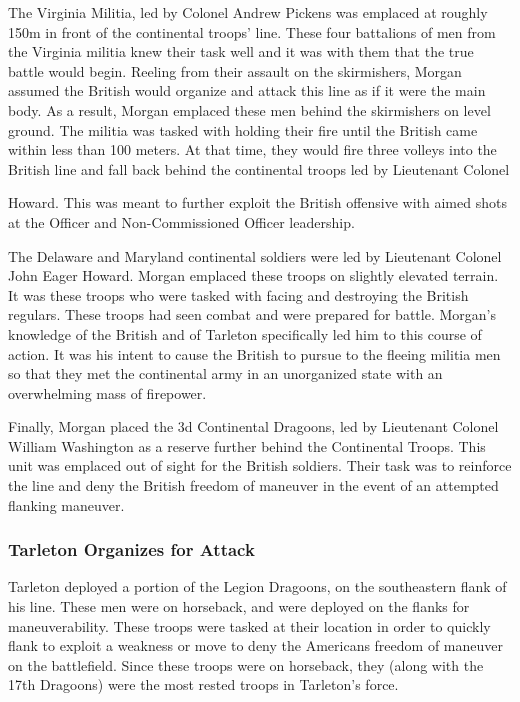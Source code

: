 The Virginia Militia, led by Colonel Andrew Pickens was emplaced at roughly
150m in front of the continental troops' line. These four battalions of men
from the Virginia militia knew their task well and it was with them that the
true battle would begin. Reeling from their assault on the skirmishers, Morgan
assumed the British would organize and attack this line as if it were the main
body. As a result, Morgan emplaced these men behind the skirmishers on level
ground. The militia was tasked with holding their fire until the British came
within less than 100 meters. At that time, they would fire three volleys into
the British line and fall back behind the continental troops led by Lieutenant
Colonel

Howard. This was meant to further exploit the British offensive with aimed
shots at the Officer and Non-Commissioned Officer leadership.

The Delaware and Maryland continental soldiers were led by Lieutenant Colonel
John Eager Howard. Morgan emplaced these troops on slightly elevated terrain.
It was these troops who were tasked with facing and destroying the British
regulars. These troops had seen combat and were prepared for battle. Morgan's
knowledge of the British and of Tarleton specifically led him to this course of
action. It was his intent to cause the British to pursue to the fleeing militia
men so that they met the continental army in an unorganized state with an
overwhelming mass of firepower.

Finally, Morgan placed the 3d Continental Dragoons, led by Lieutenant Colonel
William Washington as a reserve further behind the Continental Troops. This
unit was emplaced out of sight for the British soldiers. Their task was to
reinforce the line and deny the British freedom of maneuver in the event of an
attempted flanking maneuver.

\subsubsection{Tarleton Organizes for Attack}

Tarleton deployed a portion of the Legion Dragoons, on the southeastern flank
of his line. These men were on horseback, and were deployed on the flanks for
maneuverability. These troops were tasked at their location in order to quickly
flank to exploit a weakness or move to deny the Americans freedom of maneuver
on the battlefield. Since these troops were on horseback, they (along with the
17th Dragoons) were the most rested troops in Tarleton's force.

